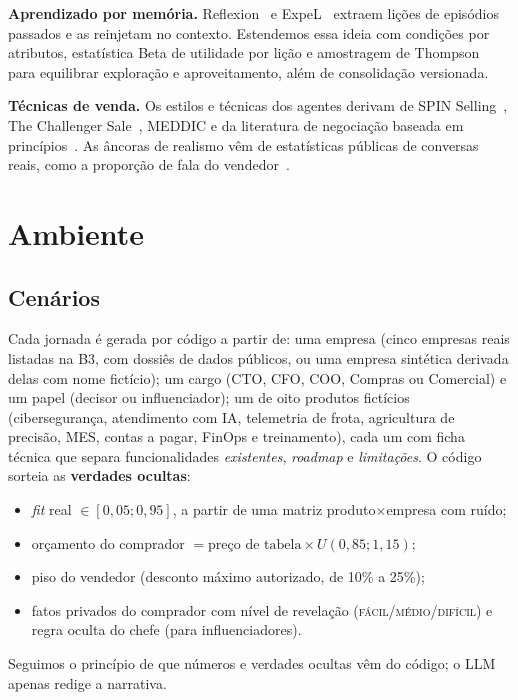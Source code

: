 \documentclass[11pt,a4paper]{article}
\begin{document}
\textbf{Aprendizado por memória.} Reflexion~\cite{shinn2023reflexion} e ExpeL~\cite{zhao2024expel} extraem lições de episódios passados e as reinjetam no contexto. Estendemos essa ideia com condições por atributos, estatística Beta de utilidade por lição e amostragem de Thompson~\cite{thompson1933} para equilibrar exploração e aproveitamento, além de consolidação versionada.

\textbf{Técnicas de venda.} Os estilos e técnicas dos agentes derivam de SPIN Selling~\cite{rackham1988spin}, The Challenger Sale~\cite{dixon2011challenger}, MEDDIC e da literatura de negociação baseada em princípios~\cite{fisher1981getting}. As âncoras de realismo vêm de estatísticas públicas de conversas reais, como a proporção de fala do vendedor~\cite{gong2024talk}.

\section{Ambiente}

\subsection{Cenários}
Cada jornada é gerada por código a partir de: uma empresa (cinco empresas reais listadas na B3, com dossiês de dados públicos, ou uma empresa sintética derivada delas com nome fictício); um cargo (CTO, CFO, COO, Compras ou Comercial) e um papel (decisor ou influenciador); um de oito produtos fictícios (cibersegurança, atendimento com IA, telemetria de frota, agricultura de precisão, MES, contas a pagar, FinOps e treinamento), cada um com ficha técnica que separa funcionalidades \emph{existentes}, \emph{roadmap} e \emph{limitações}. O código sorteia as \textbf{verdades ocultas}:
\begin{itemize}
  \item \emph{fit} real $\in[0{,}05;0{,}95]$, a partir de uma matriz produto$\times$empresa com ruído;
  \item orçamento do comprador $= \text{preço de tabela}\times U(0{,}85;1{,}15)$;
  \item piso do vendedor (desconto máximo autorizado, de 10\% a 25\%);
  \item fatos privados do comprador com nível de revelação (\textsc{fácil}/\textsc{médio}/\textsc{difícil}) e regra oculta do chefe (para influenciadores).
\end{itemize}
Seguimos o princípio de que números e verdades ocultas vêm do código; o LLM apenas redige a narrativa.
\end{document}
